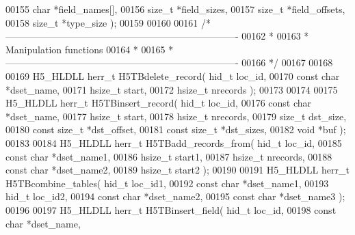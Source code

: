 \begin{DoxyCode}
00155                            \textcolor{keywordtype}{char} *field\_names[],
00156                            \textcolor{keywordtype}{size\_t} *field\_sizes,
00157                            \textcolor{keywordtype}{size\_t} *field\_offsets,
00158                            \textcolor{keywordtype}{size\_t} *type\_size );
00159 
00160 
00161 \textcolor{comment}{/*-------------------------------------------------------------------------}
00162 \textcolor{comment}{ *}
00163 \textcolor{comment}{ * Manipulation functions}
00164 \textcolor{comment}{ *}
00165 \textcolor{comment}{ *-------------------------------------------------------------------------}
00166 \textcolor{comment}{ */}
00167 
00168 
00169 H5\_HLDLL herr\_t  H5TBdelete\_record( hid\_t loc\_id,
00170                           \textcolor{keyword}{const} \textcolor{keywordtype}{char} *dset\_name,
00171                           hsize\_t start,
00172                           hsize\_t nrecords );
00173 
00174 
00175 H5\_HLDLL herr\_t  H5TBinsert\_record( hid\_t loc\_id,
00176                           \textcolor{keyword}{const} \textcolor{keywordtype}{char} *dset\_name,
00177                           hsize\_t start,
00178                           hsize\_t nrecords,
00179                           \textcolor{keywordtype}{size\_t} dst\_size,
00180                           \textcolor{keyword}{const} \textcolor{keywordtype}{size\_t} *dst\_offset,
00181                           \textcolor{keyword}{const} \textcolor{keywordtype}{size\_t} *dst\_sizes,
00182                           \textcolor{keywordtype}{void} *buf );
00183 
00184 H5\_HLDLL herr\_t  H5TBadd\_records\_from( hid\_t loc\_id,
00185                              \textcolor{keyword}{const} \textcolor{keywordtype}{char} *dset\_name1,
00186                              hsize\_t start1,
00187                              hsize\_t nrecords,
00188                              \textcolor{keyword}{const} \textcolor{keywordtype}{char} *dset\_name2,
00189                              hsize\_t start2 );
00190 
00191 H5\_HLDLL herr\_t  H5TBcombine\_tables( hid\_t loc\_id1,
00192                            \textcolor{keyword}{const} \textcolor{keywordtype}{char} *dset\_name1,
00193                            hid\_t loc\_id2,
00194                            \textcolor{keyword}{const} \textcolor{keywordtype}{char} *dset\_name2,
00195                            \textcolor{keyword}{const} \textcolor{keywordtype}{char} *dset\_name3 );
00196 
00197 H5\_HLDLL herr\_t  H5TBinsert\_field( hid\_t loc\_id,
00198                          \textcolor{keyword}{const} \textcolor{keywordtype}{char} *dset\_name,

\end{DoxyCode}
